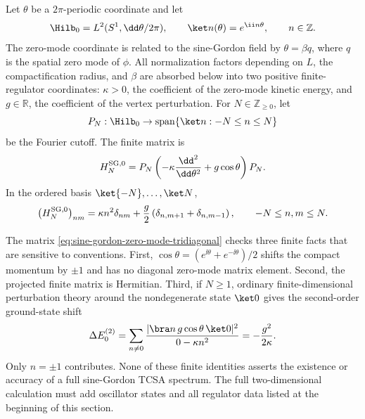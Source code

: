 Let \(\theta\) be a \(2\pi\)-periodic coordinate and let
\[
  \Hilb_0=L^2(S^1,\dd\theta/2\pi),
  \qquad
  \ket n(\theta)=e^{\ii n\theta},
  \qquad n\in\mathbb Z .
\]
The zero-mode coordinate is related to the sine-Gordon field by
\(\theta=\beta q\), where \(q\) is the spatial zero mode of \(\phi\).  All
normalization factors depending on \(L\), the compactification radius, and
\(\beta\) are absorbed below into two positive finite-regulator coordinates:
\(\kappa>0\), the coefficient of the zero-mode kinetic energy, and
\(g\in\mathbb R\), the coefficient of the vertex perturbation.  For
\(N\in\mathbb Z_{\geq0}\), let
\[
  P_N:\Hilb_0\to
  \operatorname{span}\{\ket n:-N\leq n\leq N\}
\]
be the Fourier cutoff.  The finite matrix is
\begin{equation}
  H_N^{\rm SG,0}
  =
  P_N\left(-\kappa\frac{\dd^2}{\dd\theta^2}+g\cos\theta\right)P_N .
  \label{eq:sine-gordon-zero-mode-finite-matrix}
\end{equation}
In the ordered basis \(\ket{-N},\ldots,\ket N\),
\begin{equation}
  \bigl(H_N^{\rm SG,0}\bigr)_{nm}
  =
  \kappa n^2\delta_{nm}
  +
  \frac g2\left(\delta_{n,m+1}+\delta_{n,m-1}\right),
  \qquad -N\leq n,m\leq N .
  \label{eq:sine-gordon-zero-mode-tridiagonal}
\end{equation}

\begin{remark}
\label{rem:sine-gordon-zero-mode-benchmark-scope}
The matrix \eqref{eq:sine-gordon-zero-mode-tridiagonal} checks three finite
facts that are sensitive to conventions.  First,
\(\cos\theta=(e^{\ii\theta}+e^{-\ii\theta})/2\) shifts the compact momentum
by \(\pm1\) and has no diagonal zero-mode matrix element.  Second, the
projected finite matrix is Hermitian.  Third, if \(N\geq1\), ordinary
finite-dimensional perturbation theory around the nondegenerate state
\(\ket0\) gives the second-order ground-state shift
\begin{equation}
  \Delta E_0^{(2)}
  =
  \sum_{n\neq0}
  \frac{|\bra n\,g\cos\theta\,\ket0|^2}{0-\kappa n^2}
  =
  -\frac{g^2}{2\kappa}.
  \label{eq:sine-gordon-zero-mode-second-order-shift}
\end{equation}
Only \(n=\pm1\) contributes.  None of these finite identities asserts the
existence or accuracy of a full sine-Gordon TCSA spectrum.  The full
two-dimensional calculation must add oscillator states and all regulator data
listed at the beginning of this section.
\end{remark}

